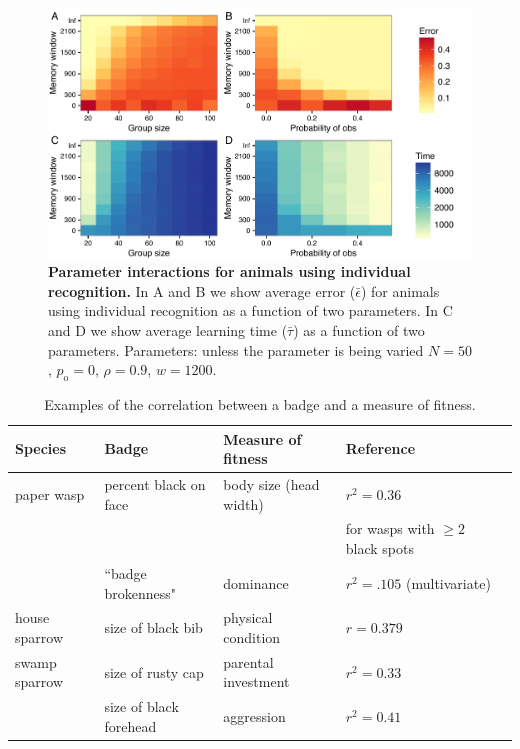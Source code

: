 \begin{figure}[ht]
\includegraphics[width=.8\textwidth]{figures/parameter_interactions_indiv.pdf}
\caption{\sffamily\small\textbf{Parameter interactions for animals using individual recognition.}
In A and B we show average error ($\bar{\epsilon}$) for animals using individual recognition as a function of two parameters. In C and D we show average learning time ($\bar{\tau}$) as a function of two parameters. Parameters: unless the parameter is being varied $N=50$, $p_\text{o}=0$, $\rho=0.9$, $w=1200$.}
\label{interactions_indiv}
\end{figure}

\begin{table}
\caption{\label{corr_examples} Examples of the correlation between a badge and a measure of fitness.}
\begin{tabular}{lllll}
Species & Badge & Measure of fitness & Reference
\\\hline paper wasp & percent black on face & body size (head width) & $r^2=0.36$  & \citep{Tibbetts:2004kx}
\\ & & & for wasps with $\geq 2$ black spots
\\ & ``badge brokenness" & dominance & $r^2=.105$ (multivariate) & \citep{Tibbetts:2004kx}
\\ \hline house sparrow & size of black bib & physical condition & $r=0.379$ & \citep{Veiga:1993fk}
\\ \hline swamp sparrow & size of rusty cap & parental investment & $r^2=0.33$ & \citep{Olsen:2010uq}
\\ & size of black forehead & aggression & $r^2=0.41$ & \citep{Olsen:2010uq}
\end{tabular}
\end{table}


